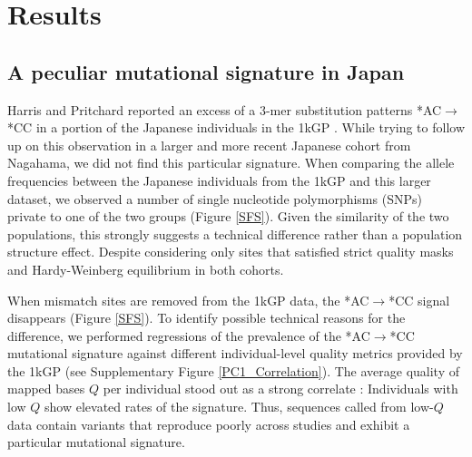 \documentclass[9pt,lineno]{elife}
\begin{document}
\section{Results}

			
\subsection{A peculiar mutational signature in Japan}			
	
Harris and Pritchard reported an excess of a 3-mer substitution patterns *AC${\rightarrow}$*CC in a portion of the Japanese individuals in the 1kGP \citep{Harris2017a}.
While trying to follow up on this observation in a larger and more recent Japanese cohort from Nagahama, we did not find this particular signature.
When comparing the allele frequencies between the Japanese individuals from the 1kGP and this larger dataset, we observed a number of single nucleotide polymorphisms (SNPs) private to one of the two groups (Figure \ref{SFS}).
Given the similarity of the two populations, this strongly suggests a technical difference rather than a population structure effect.
Despite considering only sites that satisfied strict quality masks and Hardy-Weinberg equilibrium in both cohorts.

When mismatch sites are removed from the 1kGP data, the  *AC${\rightarrow}$*CC signal disappears (Figure \ref{SFS}). To identify possible technical reasons for the difference, we performed regressions of the prevalence of the  *AC${\rightarrow}$*CC mutational signature against different individual-level quality metrics provided by the 1kGP (see Supplementary Figure \ref{PC1_Correlation}). 
The average quality of mapped bases  $Q$ per individual stood out as a strong correlate : Individuals with low $Q$ show elevated rates of the signature. 
Thus, sequences called from low-$Q$ data contain variants that reproduce poorly across studies and exhibit a particular mutational signature. 
\end{document}
